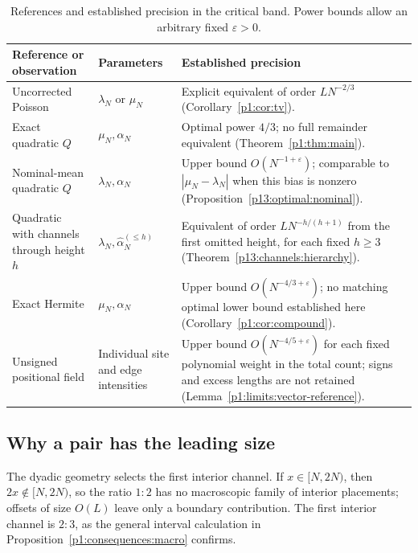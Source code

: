 \begin{table}[!htb]
\centering
\small
\caption{References and established precision in the critical band.
Power bounds allow an arbitrary fixed \(\varepsilon>0\).}
\label{p16:tab:references}
\begin{tabularx}{\textwidth}{@{}>{\raggedright\arraybackslash}p{}>{\raggedright\arraybackslash}p{}>{\raggedright\arraybackslash}X@{}}
\toprule
Reference or observation & Parameters & Established precision\\
\midrule
Uncorrected Poisson
& \(\lambda_N\) or \(\mu_N\)
& Explicit equivalent of order \(LN^{-2/3}\)
(Corollary~\ref{p1:cor:tv}).\\[4pt]
Exact quadratic \(Q\)
& \(\mu_N,\alpha_N\)
& Optimal power \(4/3\); no full remainder equivalent
(Theorem~\ref{p1:thm:main}).\\[4pt]
Nominal-mean quadratic \(Q\)
& \(\lambda_N,\alpha_N\)
& Upper bound \(O(N^{-1+\varepsilon})\); comparable to
\(|\mu_N-\lambda_N|\) when this bias is nonzero
(Proposition~\ref{p13:optimal:nominal}).\\[4pt]
Quadratic with channels through height \(h\)
& \(\lambda_N,\widehat\alpha_N^{(\le h)}\)
& Equivalent of order \(LN^{-h/(h+1)}\) from the first
omitted height, for each fixed \(h\ge3\)
(Theorem~\ref{p13:channels:hierarchy}).\\[4pt]
Exact Hermite
& \(\mu_N,\alpha_N\)
& Upper bound \(O(N^{-4/3+\varepsilon})\); no matching
optimal lower bound established here
(Corollary~\ref{p1:cor:compound}).\\[4pt]
Unsigned positional field
& Individual site and edge intensities
& Upper bound \(O(N^{-4/5+\varepsilon})\) for each fixed
polynomial weight in the total count; signs and excess lengths are not retained
(Lemma~\ref{p1:limits:vector-reference}).\\
\bottomrule
\end{tabularx}
\end{table}
\FloatBarrier

\subsection{Why a pair has the leading size}
\label{p1:intro:mechanism}

The dyadic geometry selects the first interior channel.
If \(x\in[N,2N)\), then \(2x\notin[N,2N)\), so the
ratio \(1:2\) has no macroscopic family of interior placements;
offsets of size \(O(L)\) leave only a boundary contribution.
The first interior channel is \(2:3\), as the general interval
calculation in Proposition~\ref{p1:consequences:macro} confirms.

